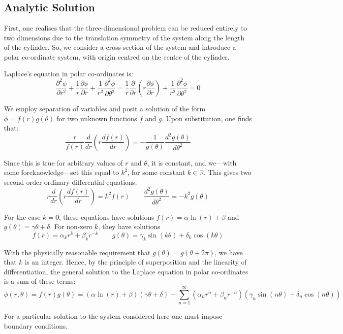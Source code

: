 \documentclass[12pt, a4paper]{article}
\newcommand{\be}{\begin{equation}}
\newcommand{\ee}{\end{equation}}
\begin{document}
\subsection{Analytic Solution}

First, one realises that the three-dimensional problem can be reduced entirely to two
dimensions due to the translation symmetry of the system along the length of the
cylinder. So, we consider a cross-section of the system and introduce a polar
co-ordinate system, with origin centred on the centre of the cylinder.

Laplace's equation in polar co-ordinates is: 
%
\be
\frac{\partial^2 \phi}{\partial r^2}+\frac{1}{r}\frac{\partial \phi}{\partial r}+\frac{1}{r^2}\frac{\partial^2 \phi}{\partial \theta^2}
= \frac{1}{r}\frac{\partial}{\partial r}(r \frac{\partial \phi}{\partial r}) + \frac{1}{r^2}\frac{\partial ^2 \phi}{\partial \theta^2}
= 0
\ee

We employ separation of variables and posit a solution of the form
$\phi = f(r)g(\theta)$ for two unknown functions $f$ and $g$. Upon substitution,
one finds that:
%
\be
\frac{r}{f(r)}\frac{d}{dr}(r \frac{df(r)}{dr}) =- \frac{1}{g(\theta)}\frac{d^2 g(\theta)}{d\theta^2}
\ee

Since this is true for arbitrary values of $r$ and $\theta$, it is constant, and
we---with some foreknowledge---set this equal to $k^2$, for some constant 
$k\in\mathbb{R}$.
This gives two second order ordinary differential equations:
%
\be
r\frac{d}{dr}(r \frac{df(r)}{dr}) = k^2 f(r) \qquad
\frac{d^2 g(\theta)}{d\theta^2}=-k^2 g(\theta)
\ee

For the case $k=0$, these equations have solutions
$f(r)=\alpha \ln(r) + \beta$ and $g(\theta) = \gamma \theta + \delta$.
For non-zero $k$, they have solutions
%
\be
f(r)=\alpha_k r^k + \beta_k r^{-k}
\qquad
g(\theta)= \gamma_k \sin(k\theta)+\delta_k \cos(k\theta)
\ee

With the physically reasonable requirement that $g(\theta)=g(\theta + 2\pi)$, we have
that $k$ is an integer. Hence, by the principle of superposition and the linearity of
differentiation, the general solution to the Laplace equation in polar co-ordinates is
a sum of these terms:
%
\be
\phi(r,\theta)
= f(r)g(\theta)
= (\alpha \ln(r) + \beta)(\gamma\theta + \delta) + \sum_{n=1}^{\infty}(\alpha_n r^n+\beta_n r^{-n})(\gamma_n \sin(n\theta) + \delta_n \cos(n\theta))
\ee

For a particular solution to the system considered here one must impose boundary
conditions.
\end{document}
